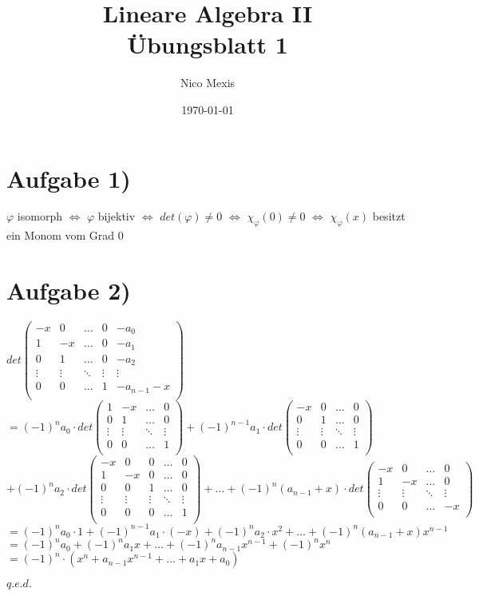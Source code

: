 \documentclass[a4paper]{article}
\title{Lineare Algebra II\\Übungsblatt 1}
\author{Nico Mexis}
\date{\today}
\newcommand{\ul}{\underline}
\renewcommand{\qed}{\begin{flushright}
\ul{\(q.e.d.\)}
\end{flushright}}
\let\phi\varphi
\begin{document}
\maketitle
\newpage

\section*{Aufgabe 1)}
\(\phi\) isomorph \(\Leftrightarrow\) \(\phi\) bijektiv \(\Leftrightarrow\) \(det(\phi)\neq 0\) \(\Leftrightarrow\) \(\chi_\phi(0)\neq 0\) \(\Leftrightarrow\) \(\chi_\phi(x)\) besitzt ein Monom vom Grad 0
\section*{Aufgabe 2)}
\(det\begin{pmatrix}
-x & 0 & \hdots & 0 & -a_0 \\
1 & -x & \hdots & 0 & -a_1 \\
0 & 1 & \hdots & 0 & -a_2 \\
\vdots & \vdots & \ddots & \vdots & \vdots \\
0 & 0 & \hdots & 1 & -a_{n-1}-x \\
\end{pmatrix}\)\\
\(=(-1)^na_0\cdot det\begin{pmatrix}
1 & -x & \hdots & 0 \\
0 & 1 & \hdots & 0 \\
\vdots & \vdots & \ddots & \vdots \\
0 & 0 & \hdots & 1 \\
\end{pmatrix}+(-1)^{n-1}a_1\cdot det\begin{pmatrix}
-x & 0 & \hdots & 0 \\
0 & 1 & \hdots & 0 \\
\vdots & \vdots & \ddots & \vdots \\
0 & 0 & \hdots & 1 \\
\end{pmatrix}\)\\
\(+(-1)^{n}a_2\cdot det\begin{pmatrix}
-x & 0 & 0 & \hdots & 0 \\
1 & -x & 0 & \hdots & 0 \\
0 & 0 & 1 & \hdots & 0 \\
\vdots & \vdots & \vdots & \ddots & \vdots \\
0 & 0 & 0 & \hdots & 1 \\
\end{pmatrix}+\dots+(-1)^{n}(a_{n-1}+x)\cdot det\begin{pmatrix}
-x & 0 & \hdots & 0 \\
1 & -x & \hdots & 0 \\
\vdots & \vdots & \ddots & \vdots \\
0 & 0 & \hdots & -x \\
\end{pmatrix}\)\\
\(=(-1)^na_0\cdot 1+(-1)^{n-1}a_1\cdot(-x)+(-1)^na_2\cdot x^2 + \dots + (-1)^n(a_{n-1}+x)x^{n-1}\)\\
\(=(-1)^na_0+(-1)^na_1x+\dots+(-1)^na_{n-1}x^{n-1}+(-1)^nx^n\)\\
\(=(-1)^n\cdot (x^n+a_{n-1}x^{n-1}+\dots+a_1x+a_0)\)
\qed
\end{document}
